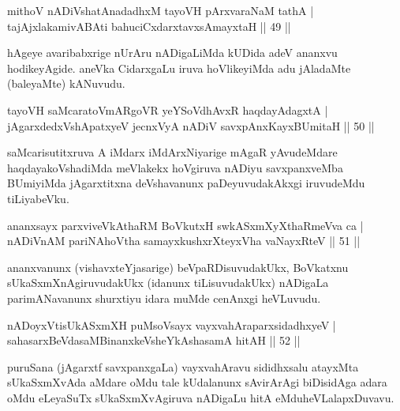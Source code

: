 
\begin{shl}
mithoV nADiVshatAnadadhxM tayoVH pArxvaraNaM tathA |\\
tajAjxlakamivA\s \s BAti bahuciCxdarxtavxsAmayxtaH \hfill || 49 || 
\end{shl}

\begin{artha}
hAgeye avaribabxrige nUrAru nADigaLiMda kUDida adeV ananxvu hodikeyAgide. aneVka CidarxgaLu iruva hoVlikeyiMda adu jAladaMte (baleyaMte) kANuvudu.
\end{artha}


\begin{shl}
tayoVH saMcaratoVmARgoVR yeYSoVdhAvxR haqdayAdagxtA |\\
jAgarxdedxVshApatxyeV jecnxVyA nADiV savxpAnxKayxBUmitaH \hfill || 50 || 
\end{shl}

\begin{artha}
saMcarisutitxruva A iMdarx iMdArxNiyarige mAgaR yAvudeMdare haqdayakoVshadiMda meVlakekx hoVgiruva nADiyu savxpanxveMba BUmiyiMda jAgarxtitxna deVshavanunx paDeyuvudakAkxgi iruvudeMdu tiLiyabeVku.
\end{artha}


\begin{shl}
ananxsayx parxviveVkAthaRM BoVkutxH swkASxmXyXthaRmeVva ca |\\
nADiVnAM pariNAhoV\s tha samayxkushxrXteyxVha vaNayxRteV \hfill || 51 || 
\end{shl}

\begin{artha}
ananxvanunx (vishavxteYjasarige) beVpaRDisuvudakUkx, BoVkatxnu sUkaSxmXnAgiruvudakUkx (idanunx tiLisuvudakUkx) nADigaLa parimANavanunx shurxtiyu idara muMde cenAnxgi heVLuvudu.
\end{artha}

\begin{shl}
nADoyxV\s tisUkASxmXH puMsoV\s sayx vayxvahAraparxsidadhxyeV |\\
sahasarxBeVdasaMBinanxkeVsheYkAshasamA hitAH \hfill || 52 || 
\end{shl}

\begin{artha}
puruSana (jAgarxtf savxpanxgaLa) vayxvahAravu sididhxsalu atayxMta sUkaSxmXvAda aMdare oMdu tale kUdalanunx sAvirArAgi biDisidAga adara oMdu eLeyaSuTx sUkaSxmXvAgiruva nADigaLu hitA eMdu\break heVLalapxDuvavu.
\end{artha}

